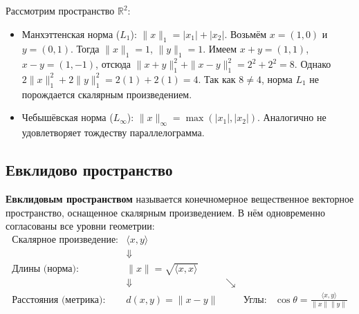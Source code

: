     \begin{example}
Рассмотрим пространство $\mathbb{R}^2$:
\begin{itemize}
    \item Манхэттенская норма ($L_1$): $\|x\|_1 = |x_1| + |x_2|$.
    Возьмём $x = (1, 0)$ и $y = (0, 1)$.
    Тогда $\|x\|_1 = 1$, $\|y\|_1 = 1$.
    Имеем $x+y = (1, 1)$, $x-y = (1, -1)$, отсюда $\|x+y\|_1^2 + \|x-y\|_1^2 = 2^2 + 2^2 = 8$.
    Однако $2\|x\|_1^2 + 2\|y\|_1^2 = 2(1) + 2(1) = 4$.
    Так как $8 \ne 4$, норма $L_1$ не порождается скалярным произведением.
    \item Чебышёвская норма ($L_\infty$): $\|x\|_\infty = \max(|x_1|, |x_2|)$.
    Аналогично не удовлетворяет тождеству параллелограмма.
\end{itemize}
    \end{example}

    \subsection{Евклидово пространство}
    \textbf{Евклидовым пространством} называется конечномерное вещественное векторное пространство, оснащенное скалярным
    произведением.
    В нём одновременно согласованы все уровни геометрии:
    \[ \begin{array}{lcccc}
           \text{Скалярное произведение:} & \langle x, y \rangle & & & \\
           & \Downarrow & & & \\
           \text{Длины (норма):} & \|x\| = \sqrt{\langle x, x \rangle} & & & \\
           & \Downarrow & \searrow & & \\
           \text{Расстояния (метрика):} & d(x, y) = \|x - y\| & & \text{Углы:} & \cos \theta = \frac{\langle x, y
           \rangle}{\|x\| \|y\|}
    \end{array} \]